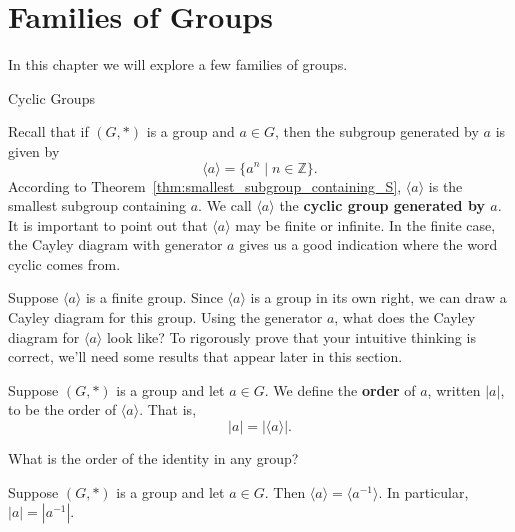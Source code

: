 \chapter{Families of Groups}
\label{chapter:families}
\thispagestyle{empty}

In this chapter we will explore a few families of groups.

\begin{section}{Cyclic Groups}

Recall that if $(G,*)$ is a group and $a\in G$, then the subgroup generated by $a$ is given by
\[
\langle a\rangle =\{a^n\mid n\in\mathbb{Z}\}.
\]
According to Theorem~\ref{thm:smallest_subgroup_containing_S}, $\langle a\rangle$ is the smallest subgroup containing $a$.  We call $\langle a\rangle$ the \textbf{cyclic group generated by $a$}.  It is important to point out that $\langle a\rangle$ may be finite or infinite. In the finite case, the Cayley diagram with generator $a$ gives us a good indication where the word cyclic comes from.

\begin{exercise}
Suppose $\langle a\rangle$ is a finite group.  Since $\langle a\rangle$ is a group in its own right, we can draw a Cayley diagram for this group.  Using the generator $a$, what does the Cayley diagram for $\langle a\rangle$ look like? To rigorously prove that your intuitive thinking is correct, we'll need some results that appear later in this section.
\end{exercise}

\begin{definition}
Suppose $(G,*)$ is a group and let $a\in G$.  We define the \textbf{order} of $a$, written $|a|$, to be the order of $\langle a\rangle$.  That is,
\[
|a|=|\langle a\rangle|.
\]
\end{definition}

\begin{exercise}
What is the order of the identity in any group?
\end{exercise}

\begin{theorem}
Suppose $(G,*)$ is a group and let $a\in G$. Then $\langle a\rangle=\langle a^{-1}\rangle$. In particular, $|a|=|a^{-1}|$.
\end{theorem}


\end{section}
